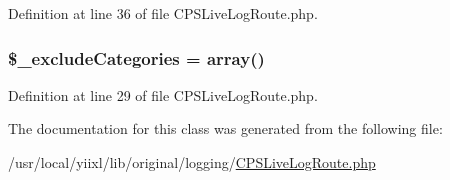 Definition at line 36 of file CPSLiveLogRoute.php.

\hypertarget{classCPSLiveLogRoute_a9c4b2e98f2d0c9401bc839d5104985ce}{
\subsubsection[{\$\_\-excludeCategories}]{\setlength{\rightskip}{0pt plus 5cm}\$\_\-excludeCategories = {\bf array}()}}
\label{classCPSLiveLogRoute_a9c4b2e98f2d0c9401bc839d5104985ce}


Definition at line 29 of file CPSLiveLogRoute.php.



The documentation for this class was generated from the following file:\begin{DoxyCompactItemize}
\item 
/usr/local/yiixl/lib/original/logging/\hyperlink{CPSLiveLogRoute_8php}{CPSLiveLogRoute.php}\end{DoxyCompactItemize}
